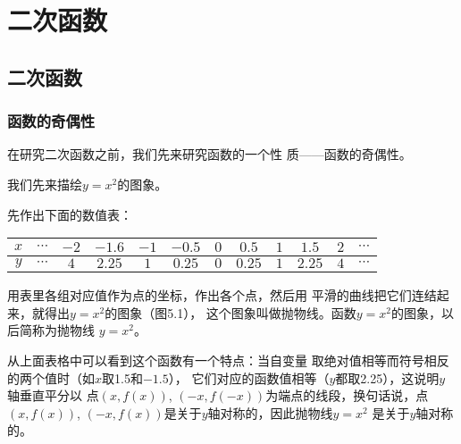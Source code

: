 \chapter{二次函数}

\section{二次函数}
\subsection{函数的奇偶性}

在研究二次函数之前，我们先来研究函数的一个性
质——函数的奇偶性。

我们先来描绘$y=x^2$的图象。

先作出下面的数值表：

\begin{center}
\begin{tabular}{c|ccccccccccc}
    \hline
    $x$   &$\cdots$&   $-2$   &   $-1.6$   &   $-1$   &   $-0.5$   &   $0$   &   $0.5$   &   $1$   &   $1.5$   &   $2$   &   $\cdots$      \\
    \hline
       $y$  &$\cdots$ &   $4$   &   $2.25$   &   $1$   &   $0.25$   &   $0$   &   $0.25$   &   $1$   &   $2.25$   &   $4$   &   $\cdots$\\
       \hline
\end{tabular}
\end{center}

用表里各组对应值作为点的坐标，作出各个点，然后用
平滑的曲线把它们连结起来，就得出$y=x^2$的图象（图5.1），
这个图象叫做抛物线。函数$y=x^2$的图象，以后简称为抛物线
$y=x^2$。

\begin{figure}[htp]
    \centering
{}
    \caption{}
\end{figure}


从上面表格中可以看到这个函数有一个特点：当自变量
取绝对值相等而符号相反的两个值时（如$x$取1.5和$-1.5$），
它们对应的函数值相等（$y$都取2.25），这说明$y$轴垂直平分以
点$(x,f(x))$, $(-x,f(-x))$为端点的线段，换句话说，点
$(x,f(x))$, $(-x,f(x))$是关于$y$轴对称的，因此抛物线$y=x^2$
是关于$y$轴对称的。

